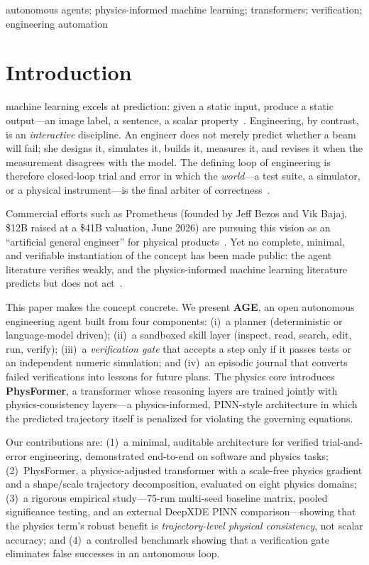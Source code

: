 \documentclass[conference,10pt]{IEEEtran}
\begin{document}
\begin{IEEEkeywords}
autonomous agents; physics-informed machine learning; transformers;
verification; engineering automation
\end{IEEEkeywords}

\section{Introduction}
 machine learning excels at prediction: given a static
input, produce a static output---an image label, a sentence, a scalar
property~\cite{lecun2015,brown2020}. Engineering, by contrast, is an
\emph{interactive} discipline. An engineer does not merely predict whether a
beam will fail; she designs it, simulates it, builds it, measures it, and
revises it when the measurement disagrees with the model. The defining loop
of engineering is therefore closed-loop trial and error in which the
\emph{world}---a test suite, a simulator, or a physical instrument---is the
final arbiter of correctness~\cite{sutton2019}.

Commercial efforts such as Prometheus (founded by Jeff Bezos and Vik Bajaj,
\$12B raised at a \$41B valuation, June 2026) are pursuing this vision as an
``artificial general engineer'' for physical products~\cite{techcrunch2026}.
Yet no complete, minimal, and verifiable instantiation of the concept has
been made public: the agent literature verifies weakly, and the
physics-informed machine learning literature predicts but does not
act~\cite{raissi2019,karniadakis2021,lu2021}.

This paper makes the concept concrete. We present \textbf{AGE}, an open
autonomous engineering agent built from four components: (i)~a planner
(deterministic or language-model driven); (ii)~a sandboxed skill layer
(inspect, read, search, edit, run, verify); (iii)~a \emph{verification gate}
that accepts a step only if it passes tests or an independent numeric
simulation; and (iv)~an episodic journal that converts failed verifications
into lessons for future plans. The physics core introduces
\textbf{PhysFormer}, a transformer whose reasoning layers are trained jointly
with physics-consistency layers---a physics-informed, PINN-style
architecture in which the predicted trajectory itself is penalized for
violating the governing equations.

Our contributions are: (1)~a minimal, auditable architecture for verified
trial-and-error engineering, demonstrated end-to-end on software and physics
tasks; (2)~PhysFormer, a physics-adjusted transformer with a scale-free
physics gradient and a shape/scale trajectory decomposition, evaluated on
eight physics domains; (3)~a rigorous empirical study---75-run multi-seed
baseline matrix, pooled significance testing, and an external DeepXDE PINN
comparison---showing that the physics term's robust benefit is
\emph{trajectory-level physical consistency}, not scalar accuracy; and
(4)~a controlled benchmark showing that a verification gate eliminates false
successes in an autonomous loop.
\end{document}
